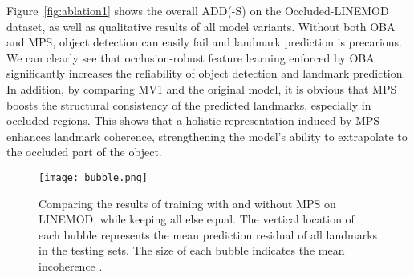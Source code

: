 \documentclass[10pt,twocolumn,letterpaper]{article}
\begin{document}
Figure~\ref{fig:ablation1} shows the overall ADD(-S) on the Occluded-LINEMOD dataset, as well as qualitative results of all model variants. Without both OBA and MPS, object detection can easily fail and landmark prediction is precarious. We can clearly see that occlusion-robust feature learning enforced by OBA significantly increases the reliability of object detection and landmark prediction. In addition, by comparing MV1 and the original model, it is obvious that MPS boosts the structural consistency of the predicted landmarks, especially in occluded regions. This shows that a holistic representation induced by MPS enhances landmark coherence, strengthening the model's ability to extrapolate to the occluded part of the object.

\begin{figure}[t]
    \centering
    \texttt{[image: bubble.png]}
    \caption{Comparing the results of training with and without MPS on LINEMOD, while keeping all else equal. The vertical location of each bubble represents the mean prediction residual  of all landmarks in the testing sets. The size of each bubble indicates the mean incoherence .  }
    \label{fig:mps}
\end{figure}
\end{document}
